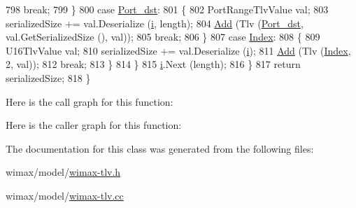 \begin{DoxyCode}
798             \textcolor{keywordflow}{break};
799           \}
800         \textcolor{keywordflow}{case} \hyperlink{classns3_1_1ClassificationRuleVectorTlvValue_a9945c44c631de44d3b9c8dc9560cb820a20c3a1510829e04b8f8857b536b77471}{Port\_dst}:
801           \{
802             PortRangeTlvValue val;
803             serializedSize += val.Deserialize (\hyperlink{bernuolliDistribution_8m_a6f6ccfcf58b31cb6412107d9d5281426}{i}, length);
804             \hyperlink{classns3_1_1VectorTlvValue_a9a422b96698c94e7bb4705026e236f35}{Add} (Tlv (\hyperlink{classns3_1_1ClassificationRuleVectorTlvValue_a9945c44c631de44d3b9c8dc9560cb820a20c3a1510829e04b8f8857b536b77471}{Port\_dst}, val.GetSerializedSize (), val));
805             \textcolor{keywordflow}{break};
806           \}
807         \textcolor{keywordflow}{case} \hyperlink{classns3_1_1ClassificationRuleVectorTlvValue_a9945c44c631de44d3b9c8dc9560cb820a411a276461e9e48f9bc54fecce932f54}{Index}:
808           \{
809             U16TlvValue val;
810             serializedSize += val.Deserialize (\hyperlink{bernuolliDistribution_8m_a6f6ccfcf58b31cb6412107d9d5281426}{i});
811             \hyperlink{classns3_1_1VectorTlvValue_a9a422b96698c94e7bb4705026e236f35}{Add} (Tlv (\hyperlink{classns3_1_1ClassificationRuleVectorTlvValue_a9945c44c631de44d3b9c8dc9560cb820a411a276461e9e48f9bc54fecce932f54}{Index}, 2, val));
812             \textcolor{keywordflow}{break};
813           \}
814         \}
815       \hyperlink{bernuolliDistribution_8m_a6f6ccfcf58b31cb6412107d9d5281426}{i}.Next (length);
816     \}
817   \textcolor{keywordflow}{return} serializedSize;
818 \}
\end{DoxyCode}


Here is the call graph for this function\+:




Here is the caller graph for this function\+:




The documentation for this class was generated from the following files\+:\begin{DoxyCompactItemize}
\item 
wimax/model/\hyperlink{wimax-tlv_8h}{wimax-\/tlv.\+h}\item 
wimax/model/\hyperlink{wimax-tlv_8cc}{wimax-\/tlv.\+cc}\end{DoxyCompactItemize}
